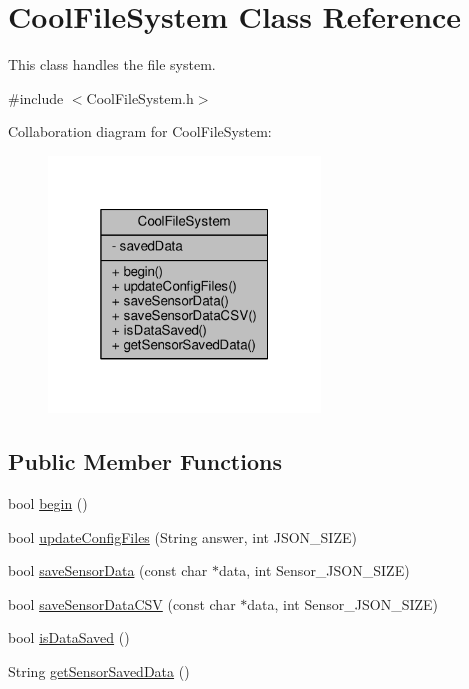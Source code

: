 \hypertarget{classCoolFileSystem}{}\section{Cool\+File\+System Class Reference}
\label{classCoolFileSystem}


This class handles the file system.  




{\ttfamily \#include $<$Cool\+File\+System.\+h$>$}



Collaboration diagram for Cool\+File\+System\+:\nopagebreak
\begin{figure}[H]
\begin{center}
\leavevmode
\includegraphics[width=205pt]{classCoolFileSystem__coll__graph}
\end{center}
\end{figure}
\subsection*{Public Member Functions}
\begin{DoxyCompactItemize}
\item 
bool \hyperlink{classCoolFileSystem_a6ba6f666ed4c530174f8569d2c636748}{begin} ()
\item 
bool \hyperlink{classCoolFileSystem_a32dad79ae80182a83e2e8f52286b7c7b}{update\+Config\+Files} (String answer, int J\+S\+O\+N\+\_\+\+S\+I\+ZE)
\item 
bool \hyperlink{classCoolFileSystem_a4c560c2ddd40b74b7758e6ceb2c58957}{save\+Sensor\+Data} (const char $\ast$data, int Sensor\+\_\+\+J\+S\+O\+N\+\_\+\+S\+I\+ZE)
\item 
bool \hyperlink{classCoolFileSystem_af5a51e2b9bb6e7e7edf75a508fe75f82}{save\+Sensor\+Data\+C\+SV} (const char $\ast$data, int Sensor\+\_\+\+J\+S\+O\+N\+\_\+\+S\+I\+ZE)
\item 
bool \hyperlink{classCoolFileSystem_a5a7eaeea7a9fbf8aaef651d862fa3b5b}{is\+Data\+Saved} ()
\item 
String \hyperlink{classCoolFileSystem_a5c58bca3735c0ed3efb268d70ef998ef}{get\+Sensor\+Saved\+Data} ()
\end{DoxyCompactItemize}
